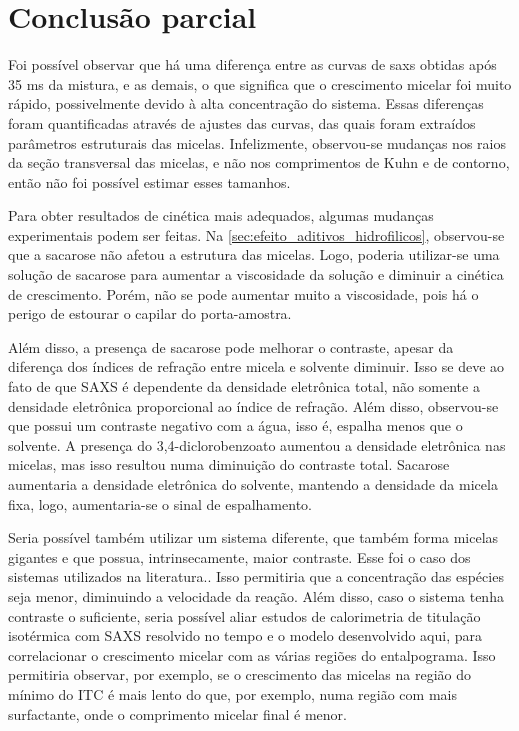 	\FloatBarrier
	
	\section{Conclusão parcial}  
	
	Foi possível observar que há uma diferença entre as curvas de saxs obtidas após 35 ms da mistura, e as demais, o que significa que o crescimento micelar foi muito rápido, possivelmente devido à alta concentração do sistema. Essas diferenças foram quantificadas através de ajustes das curvas, das quais foram extraídos parâmetros estruturais das micelas. Infelizmente, observou-se mudanças nos raios da seção transversal das micelas, e não nos comprimentos de Kuhn e de contorno, então não foi possível estimar esses tamanhos.
	
	Para obter resultados de cinética mais adequados, algumas mudanças experimentais podem ser feitas. Na \autoref{sec:efeito_aditivos_hidrofilicos}, observou-se que a sacarose não afetou a estrutura das micelas. Logo, poderia utilizar-se uma solução de sacarose para aumentar a viscosidade da solução e diminuir a cinética de crescimento. Porém, não se pode aumentar muito a viscosidade, pois há o perigo de estourar o capilar do porta-amostra.
	
	Além disso, a presença de sacarose pode melhorar o contraste, apesar da diferença dos índices de refração entre micela e solvente diminuir. Isso se deve ao fato de que SAXS é dependente da densidade eletrônica total, não somente a densidade eletrônica proporcional ao índice de refração. Além disso, observou-se que \TTAB{} possui um contraste negativo com a água, isso é, espalha menos que o solvente. A presença do 3,4-diclorobenzoato aumentou a densidade eletrônica nas micelas, mas isso resultou numa diminuição do contraste total. %
	Sacarose aumentaria a densidade eletrônica do solvente, mantendo a densidade da micela fixa, logo, aumentaria-se o sinal de espalhamento.
	
	Seria possível também utilizar um sistema diferente, que também forma micelas gigantes e que possua, intrinsecamente, maior contraste. Esse foi o caso dos sistemas utilizados na literatura.\cite{Jensen2014a, Jensen2013a, Jensen2016a}.	Isso permitiria que a concentração das espécies seja menor, diminuindo a velocidade da reação. Além disso, caso o sistema tenha contraste o suficiente, seria possível aliar estudos de calorimetria de titulação isotérmica com SAXS resolvido no tempo e o modelo desenvolvido aqui, para correlacionar o crescimento micelar com as várias regiões do entalpograma. Isso permitiria observar, por exemplo, se o crescimento das micelas na região do mínimo do ITC é mais lento do que, por exemplo, numa região com mais surfactante, onde o comprimento micelar final é menor.
	
